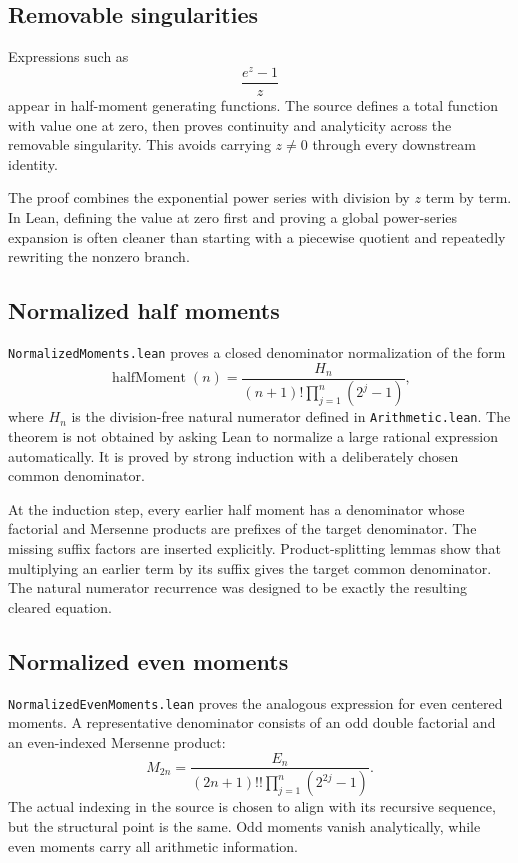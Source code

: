 \documentclass[11pt,oneside]{article}
\theoremstyle{definition}
\theoremstyle{remark}
\begin{document}
\subsection{Removable singularities}
Expressions such as
\[
  \frac{e^z-1}{z}
\]
appear in half-moment generating functions.  The source defines a total function with value one at zero, then proves continuity and analyticity across the removable singularity.  This avoids carrying \(z\ne0\) through every downstream identity.

The proof combines the exponential power series with division by \(z\) term by term.  In Lean, defining the value at zero first and proving a global power-series expansion is often cleaner than starting with a piecewise quotient and repeatedly rewriting the nonzero branch.

\subsection{Normalized half moments}
\nolinkurl{NormalizedMoments.lean} proves a closed denominator normalization of the form
\[
  \operatorname{halfMoment}(n)
   =\frac{H_n}{(n+1)!\prod_{j=1}^{n}(2^j-1)},
\]
where \(H_n\) is the division-free natural numerator defined in \nolinkurl{Arithmetic.lean}.  The theorem is not obtained by asking Lean to normalize a large rational expression automatically.  It is proved by strong induction with a deliberately chosen common denominator.

At the induction step, every earlier half moment has a denominator whose factorial and Mersenne products are prefixes of the target denominator.  The missing suffix factors are inserted explicitly.  Product-splitting lemmas show that multiplying an earlier term by its suffix gives the target common denominator.  The natural numerator recurrence was designed to be exactly the resulting cleared equation.

\subsection{Normalized even moments}
\nolinkurl{NormalizedEvenMoments.lean} proves the analogous expression for even centered moments.  A representative denominator consists of an odd double factorial and an even-indexed Mersenne product:
\[
  M_{2n}
  =\frac{E_n}{(2n+1)!!\prod_{j=1}^{n}(2^{2j}-1)}.
\]
The actual indexing in the source is chosen to align with its recursive sequence, but the structural point is the same.  Odd moments vanish analytically, while even moments carry all arithmetic information.
\end{document}
